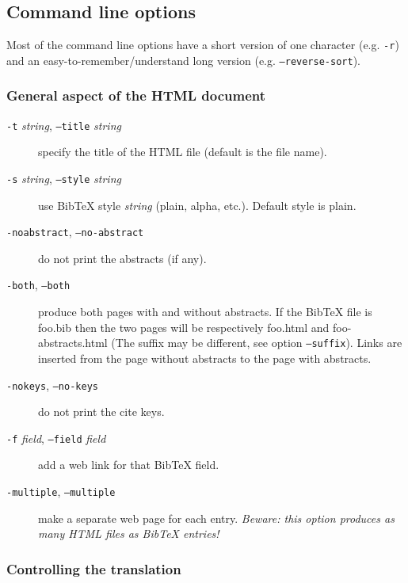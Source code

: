 \documentclass[11pt,a4paper]{article}
\begin{document}
\subsection{Command line options}

Most of the command line options have a short version of one character
(e.g. \texttt{-r}) and an easy-to-remember/understand long version 
(e.g. \texttt{--reverse-sort}).

\subsubsection{General aspect of the HTML document}

\begin{description}
  
\item[\texttt{-t} \textit{string}, \texttt{--title} \textit{string}]
  specify the title of the HTML file (default is the file name).

  
\item[\texttt{-s} \textit{string}, \texttt{--style} \textit{string}]
  use BibTeX style \textit{string} (plain, alpha, etc.).  Default
  style is plain.

  
\item[\texttt{-noabstract}, \texttt{--no-abstract}] do not print the
  abstracts (if any).

  
\item[\texttt{-both}, \texttt{--both}] produce both pages with and
  without abstracts. If the BibTeX file is foo.bib then the two pages
  will be respectively foo.html and foo-abstracts.html (The suffix may
  be different, see option \texttt{--suffix}). Links are inserted from
  the page without abstracts to the page with abstracts.

  
\item[\texttt{-nokeys}, \texttt{--no-keys}] do not print the cite
  keys.

  
\item[\texttt{-f} \textit{field}, \texttt{--field} \textit{field}] add
  a web link for that BibTeX field.

  
\item[\texttt{-multiple}, \texttt{--multiple}] make a separate web
  page for each entry.  \textit{Beware: this option produces as many
    HTML files as BibTeX entries!}


\end{description}


\subsubsection{Controlling the translation}
\end{document}
